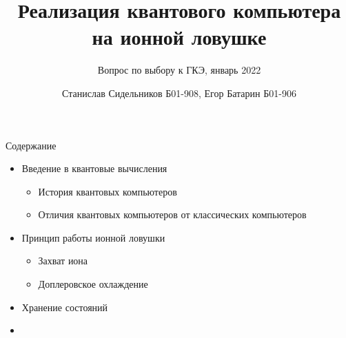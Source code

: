 \documentclass{beamer}
\title{Реализация квантового компьютера на ионной ловушке}
\subtitle{Вопрос по выбору к ГКЭ, январь 2022}
\author{Станислав Сидельников Б01-908, Егор Батарин Б01-906}
\institute{Московский физико-технический институт}
\date{}
\begin{document}
    
    \begin{frame}
        \titlepage
    \end{frame}

    \begin{frame}{Содержание}

        \begin{itemize}
            \item Введение в квантовые вычисления

                \begin{itemize}
                    \item История квантовых компьютеров
                    \item Отличия квантовых компьютеров от классических компьютеров
                \end{itemize}

            \item Принцип работы ионной ловушки

                \begin{itemize}
                    \item{Захват иона}
                    \item{Доплеровское охлаждение}
                \end{itemize}

            \item Хранение состояний

            \item
        \end{itemize}

    \end{frame}
    
\end{document}
